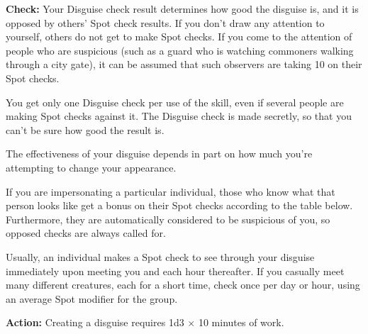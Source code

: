 \textbf{Check:} Your Disguise check result determines how good the disguise is, and it is opposed by others’ Spot check results. If you don’t draw any attention to yourself, others do not get to make Spot checks. If you come to the attention of people who are suspicious (such as a guard who is watching commoners walking through a city gate), it can be assumed that such observers are taking 10 on their Spot checks.

You get only one Disguise check per use of the skill, even if several people are making Spot checks against it. The Disguise check is made secretly, so that you can’t be sure how good the result is.

The effectiveness of your disguise depends in part on how much you’re attempting to change your appearance.


If you are impersonating a particular individual, those who know what that person looks like get a bonus on their Spot checks according to the table below. Furthermore, they are automatically considered to be suspicious of you, so opposed checks are always called for.


Usually, an individual makes a Spot check to see through your disguise immediately upon meeting you and each hour thereafter. If you casually meet many different creatures, each for a short time, check once per day or hour, using an average Spot modifier for the group.

\textbf{Action:} Creating a disguise requires 1d3 $\times$ 10 minutes of work.

